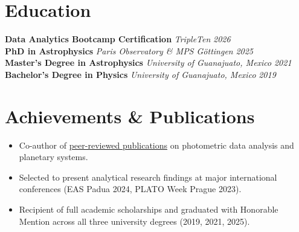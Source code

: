 \documentclass[10pt,a4paper]{article}
\begin{document}
\section*{Education}
\textbf{Data Analytics Bootcamp Certification} \hfill \textit{TripleTen} \hfill \textit{2026}\\
\textbf{PhD in Astrophysics} \hfill \textit{Paris Observatory \& MPS Göttingen} \hfill \textit{2025}\\
\textbf{Master's Degree in Astrophysics} \hfill \textit{University of Guanajuato, Mexico} \hfill \textit{2021}\\
\textbf{Bachelor's Degree in Physics} \hfill \textit{University of Guanajuato, Mexico} \hfill \textit{2019}

\section*{Achievements \& Publications}
\begin{itemize}[leftmargin=1.5em]
    \item Co-author of \href{https://ui.adsabs.harvard.edu/search/fq...}{peer-reviewed publications} on photometric data analysis and planetary systems.
    \item Selected to present analytical research findings at major international conferences (EAS Padua 2024, PLATO Week Prague 2023).
    \item Recipient of full academic scholarships and graduated with Honorable Mention across all three university degrees (2019, 2021, 2025).
\end{itemize}
\end{document}
